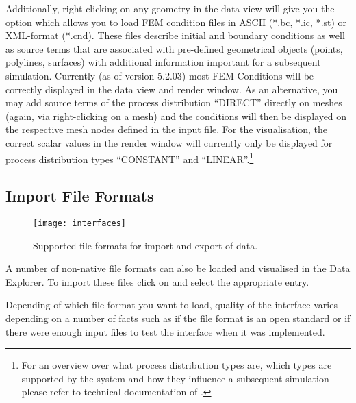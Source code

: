 Additionally, right-clicking on any geometry in the data view will give you the option  which allows you to load FEM condition files in ASCII (*.bc, *.ic, *.st) or XML-format (*.cnd). These files describe initial and boundary conditions as well as source terms that are associated with pre-defined geometrical objects (points, polylines, surfaces) with additional information important for a subsequent simulation. Currently (as of version 5.2.03) most FEM Conditions will be correctly displayed in the data view and render window. As an alternative, you may add source terms of the process distribution ``DIRECT'' directly on meshes (again, via right-clicking on a mesh) and the conditions will then be displayed on the respective mesh nodes defined in the input file. For the visualisation, the correct scalar values in the render window will currently only be displayed for process distribution types ``CONSTANT'' and ``LINEAR''.\footnote{For an overview over what process distribution types are, which types are supported by the system and how they influence a subsequent simulation please refer to technical documentation of \ogs.}

\subsection{Import File Formats}

\begin{figure}[tb]
\begin{center}
\texttt{[image: interfaces]}
\caption{Supported file formats for import and export of data.}
\label{fig:interfaces}
\end{center}
\end{figure}

A number of non-native file formats can also be loaded and visualised in the Data Explorer. To import these files click on  and select the appropriate entry.

Depending of which file format you want to load, quality of the interface varies depending on a number of facts such as if the file format is an open standard or if there were enough input files to test the interface when it was implemented.

